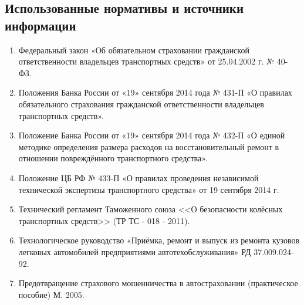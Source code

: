        
\def\итог{380950}
\def\итогизнос{215550}
\def\рынок{100000}	       
\def\нормочас{950}
	       
	       

\subsection{Использованные нормативы и источники информации}

\begin{enumerate}
\item   Федеральный закон «Об обязательном страховании гражданской ответственности владельцев транспортных средств» от 25.04.2002 г. № 40-ФЗ.
\item  Положения Банка России от «19» сентября 2014 года № 431-П «О правилах обязательного страхования гражданской ответственности владельцев транспортных средств».
\item  Положение Банка России от «19» сентября 2014 года № 432-П «О единой методике определения размера расходов на восстановительный ремонт в отношении повреждённого транспортного средства».
\item  Положение ЦБ РФ № 433-П «О правилах проведения независимой технической экспертизы транспортного средства» от 19 сентября 2014 г.
\item  Технический регламент Таможенного союза <<О безопасности колёсных транспортных средств>> (ТР ТС - 018 - 2011).
\item  Технологическое руководство «Приёмка, ремонт и выпуск из ремонта кузовов легковых автомобилей предприятиями автотехобслуживания» РД 37.009.024-92.
\item  Предотвращение страхового мошенничества в автостраховании  (практическое  пособие)  М.  2005.

\end{enumerate}
